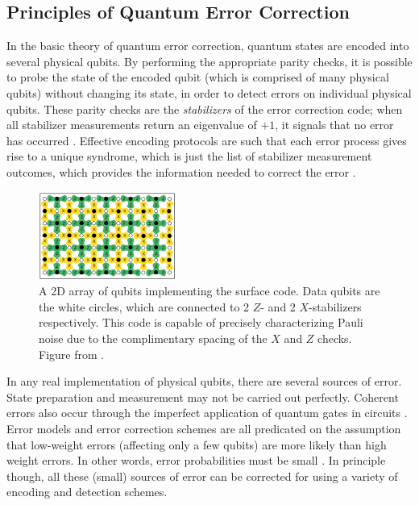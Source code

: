 \subsection{Principles of Quantum Error Correction}
In the basic theory of quantum error correction, quantum states are encoded into
several physical qubits. By performing the appropriate parity checks, it is
possible to probe the state of the encoded qubit (which is comprised of many
physical qubits) without changing its state, in order to detect errors on
individual physical qubits. These parity checks are the \textit{stabilizers} of
the error correction code; when all stabilizer measurements return an eigenvalue
of $+1$, it signals that no error has occurred \cite{nielsen_chuang_2010}.
Effective encoding protocols are such that each error process gives rise to a
unique syndrome, which is just the list of stabilizer measurement outcomes,
which provides the information needed to correct the error \cite{fowler12_surfac_codes}.

\begin{figure}
  \centering
  \includegraphics[width=0.4\textwidth]{images/surface_code.png}
  \caption{A 2D array of qubits implementing the surface code. Data qubits are
    the white circles, which are connected to 2 $Z$- and 2 $X$-stabilizers
    respectively. This code is capable of precisely characterizing Pauli noise
    due to the complimentary spacing of the $X$ and $Z$ checks. Figure from
    \cite{fowler12_surfac_codes}.}
  \label{fig:surface_code}
\end{figure}

In any real implementation of physical qubits, there are several sources of
error. State preparation and measurement may not be carried out perfectly.
Coherent errors also occur through the imperfect application of quantum gates in
circuits \cite{Devitt_2013}. Error models and error correction schemes are all
predicated on the assumption that low-weight errors (affecting only a few
qubits) are more likely than high weight errors. In other words, error
probabilities must be small \cite{terhal15}. In principle though, all these
(small) sources of error can be corrected for using a variety of encoding and
detection schemes.

